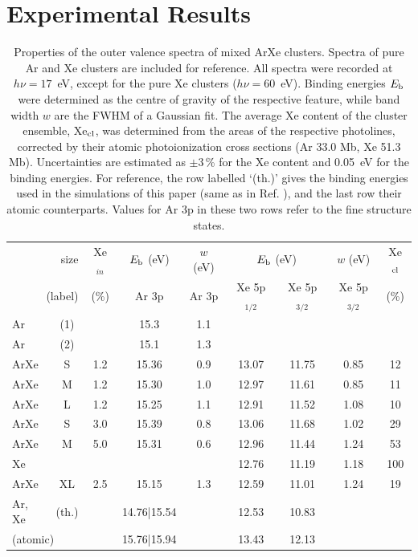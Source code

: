 \section{Experimental Results
\label{sec:exp_results}}


\begin{table}
\caption{Properties of the outer valence spectra of mixed ArXe clusters. 
Spectra of pure Ar and Xe clusters are included for reference. 
All spectra were recorded at $h\nu = 17$~eV, except for the pure Xe clusters ($h\nu = 60$~eV). 
Binding energies $E_{\rm b}$ were determined as the centre of gravity of the respective feature, while band width $w$ are the FWHM of a Gaussian fit. 
The average Xe content of the cluster ensemble, Xe$_{\rm cl}$, was determined from the areas of the respective photolines, corrected by their atomic photoionization cross sections (Ar 33.0 Mb, Xe 51.3 Mb)\cite{samson2002}.
Uncertainties are estimated as $\pm$3\,\% for the Xe content and 0.05~eV for the binding energies. 
For reference, the row labelled `(th.)' gives the binding energies used in the simulations of this paper (same as in Ref. ), and the last row their atomic counterparts. 
Values for Ar 3p in these two rows refer to the fine structure states.
\label{tab:valence} }
\begin{tabular}{ l c c c c c c c c}
%
\toprule
 \multicolumn{2}{r}{size} &  Xe$_{in}$& $E_{\rm b}$ (eV)& $w$ (eV)& \multicolumn{2}{c}{$E_{\rm b}$ (eV)}  & $w$ (eV) &  Xe$_{\rm cl}$ \\
%
 \multicolumn{2}{r}{(label)}&  (\%) & Ar 3p & Ar 3p & Xe 5p$_{1/2}$ &  Xe 5p$_{3/2}$ & Xe 5p$_{3/2}$  &  (\%) \\
\midrule
 Ar & (1) &&  15.3  &  1.1 & & & &  \\
 Ar & (2) &&  15.1  &  1.3 & & & &  \\
%
 ArXe & S &1.2 & 15.36 & 0.9 & 13.07 & 11.75 & 0.85 & 12\\
 ArXe & M &1.2 & 15.30 & 1.0 & 12.97 & 11.61 & 0.85 & 11\\
 ArXe & L &1.2 & 15.25 & 1.1 & 12.91 & 11.52 & 1.08 & 10\\
 ArXe & S &3.0 & 15.39 & 0.8 & 13.06 & 11.68 & 1.02 & 29\\
 ArXe & M &5.0 & 15.31 & 0.6 & 12.96 & 11.44 & 1.24 & 53\\
 Xe &  & & & & 12.76 & 11.19 & 1.18 & 100\\
%
\midrule
%
 ArXe & XL &2.5 & 15.15 & 1.3 & 12.59 & 11.01 & 1.24 & 19\\
%
\midrule
%
 Ar, Xe & (th.) && 14.76|15.54 && 12.53 & 10.83 &&\\
%
 \multicolumn{2}{l}{(atomic)\cite{velchev,sansonetti}} && 15.76|15.94 && 13.43 & 12.13 &&\\
%
\bottomrule
\end{tabular}
\end{table}

